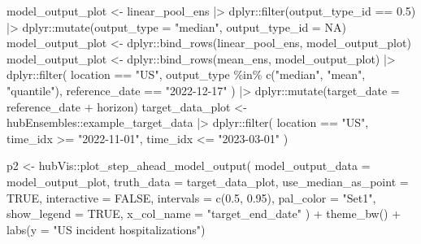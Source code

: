 \documentclass[
]{article}
\newenvironment{Shaded}{\begin{snugshade}}{\end{snugshade}}
\newcommand{\AttributeTok}[1]{\textcolor[rgb]{0.40,0.45,0.13}{#1}}
\newcommand{\ConstantTok}[1]{\textcolor[rgb]{0.56,0.35,0.01}{#1}}
\newcommand{\FloatTok}[1]{\textcolor[rgb]{0.68,0.00,0.00}{#1}}
\newcommand{\FunctionTok}[1]{\textcolor[rgb]{0.28,0.35,0.67}{#1}}
\newcommand{\NormalTok}[1]{\textcolor[rgb]{0.00,0.23,0.31}{#1}}
\newcommand{\OtherTok}[1]{\textcolor[rgb]{0.00,0.23,0.31}{#1}}
\newcommand{\SpecialCharTok}[1]{\textcolor[rgb]{0.37,0.37,0.37}{#1}}
\newcommand{\StringTok}[1]{\textcolor[rgb]{0.13,0.47,0.30}{#1}}
\begin{document}
\begin{Shaded}
\begin{Highlighting}[]
\NormalTok{model\_output\_plot }\OtherTok{\textless{}{-}}\NormalTok{ linear\_pool\_ens }\SpecialCharTok{|\textgreater{}}
\NormalTok{  dplyr}\SpecialCharTok{::}\FunctionTok{filter}\NormalTok{(output\_type\_id }\SpecialCharTok{==} \FloatTok{0.5}\NormalTok{) }\SpecialCharTok{|\textgreater{}}
\NormalTok{  dplyr}\SpecialCharTok{::}\FunctionTok{mutate}\NormalTok{(}\AttributeTok{output\_type =} \StringTok{"median"}\NormalTok{, }\AttributeTok{output\_type\_id =} \ConstantTok{NA}\NormalTok{)}
\NormalTok{model\_output\_plot }\OtherTok{\textless{}{-}}\NormalTok{ dplyr}\SpecialCharTok{::}\FunctionTok{bind\_rows}\NormalTok{(linear\_pool\_ens, model\_output\_plot)}
\NormalTok{model\_output\_plot }\OtherTok{\textless{}{-}}\NormalTok{ dplyr}\SpecialCharTok{::}\FunctionTok{bind\_rows}\NormalTok{(mean\_ens, model\_output\_plot) }\SpecialCharTok{|\textgreater{}}
\NormalTok{  dplyr}\SpecialCharTok{::}\FunctionTok{filter}\NormalTok{(}
\NormalTok{    location }\SpecialCharTok{==} \StringTok{"US"}\NormalTok{,}
\NormalTok{    output\_type }\SpecialCharTok{\%in\%} \FunctionTok{c}\NormalTok{(}\StringTok{"median"}\NormalTok{, }\StringTok{"mean"}\NormalTok{, }\StringTok{"quantile"}\NormalTok{),}
\NormalTok{    reference\_date }\SpecialCharTok{==} \StringTok{"2022{-}12{-}17"}
\NormalTok{  ) }\SpecialCharTok{|\textgreater{}}
\NormalTok{  dplyr}\SpecialCharTok{::}\FunctionTok{mutate}\NormalTok{(}\AttributeTok{target\_date =}\NormalTok{ reference\_date }\SpecialCharTok{+}\NormalTok{ horizon)}
\NormalTok{target\_data\_plot }\OtherTok{\textless{}{-}}\NormalTok{ hubEnsembles}\SpecialCharTok{::}\NormalTok{example\_target\_data }\SpecialCharTok{|\textgreater{}}
\NormalTok{  dplyr}\SpecialCharTok{::}\FunctionTok{filter}\NormalTok{(}
\NormalTok{    location }\SpecialCharTok{==} \StringTok{"US"}\NormalTok{, time\_idx }\SpecialCharTok{\textgreater{}=} \StringTok{"2022{-}11{-}01"}\NormalTok{,}
\NormalTok{    time\_idx }\SpecialCharTok{\textless{}=} \StringTok{"2023{-}03{-}01"}
\NormalTok{  )}

\NormalTok{p2 }\OtherTok{\textless{}{-}}
\NormalTok{  hubVis}\SpecialCharTok{::}\FunctionTok{plot\_step\_ahead\_model\_output}\NormalTok{(}
    \AttributeTok{model\_output\_data =}\NormalTok{ model\_output\_plot,}
    \AttributeTok{truth\_data =}\NormalTok{ target\_data\_plot,}
    \AttributeTok{use\_median\_as\_point =} \ConstantTok{TRUE}\NormalTok{,}
    \AttributeTok{interactive =} \ConstantTok{FALSE}\NormalTok{,}
    \AttributeTok{intervals =} \FunctionTok{c}\NormalTok{(}\FloatTok{0.5}\NormalTok{, }\FloatTok{0.95}\NormalTok{),}
    \AttributeTok{pal\_color =} \StringTok{"Set1"}\NormalTok{,}
    \AttributeTok{show\_legend =} \ConstantTok{TRUE}\NormalTok{,}
    \AttributeTok{x\_col\_name =} \StringTok{"target\_end\_date"}
\NormalTok{  ) }\SpecialCharTok{+}
  \FunctionTok{theme\_bw}\NormalTok{() }\SpecialCharTok{+}
  \FunctionTok{labs}\NormalTok{(}\AttributeTok{y =} \StringTok{"US incident hospitalizations"}\NormalTok{)}


\end{Highlighting}
\end{Shaded}
\end{document}
